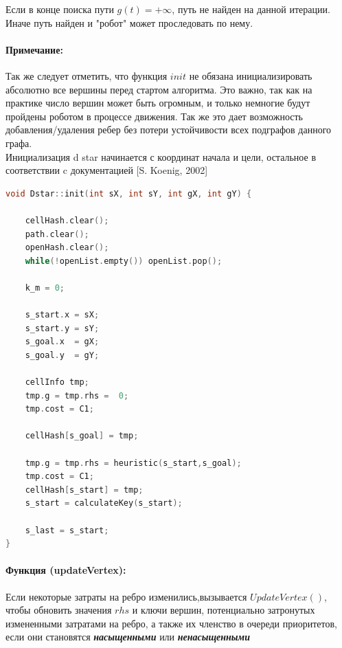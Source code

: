 \documentclass[12pt]{article}
\begin{document}
Если в конце поиска пути $g(t) = + \infty$, путь не найден на данной итерации. Иначе путь найден и "робот" может проследовать по нему.
\paragraph{Примечание:} Так же следует отметить, что функция $init$ не обязана инициализировать абсолютно все вершины перед стартом алгоритма. Это важно, так как на практике число вершин может быть огромным, и только немногие будут пройдены роботом в процессе движения. Так же это дает возможность добавления/удаления ребер без потери устойчивости всех подграфов данного графа.\\
Инициализация d star начинается с координат начала и цели, остальное в соответствии c 
документацией [S. Koenig, 2002]
\newpage
\begin{lstlisting}[language=C,style=C]
void Dstar::init(int sX, int sY, int gX, int gY) {

    cellHash.clear();
    path.clear();
    openHash.clear();
    while(!openList.empty()) openList.pop();

    k_m = 0;

    s_start.x = sX;
    s_start.y = sY;
    s_goal.x  = gX;
    s_goal.y  = gY;

    cellInfo tmp;
    tmp.g = tmp.rhs =  0;
    tmp.cost = C1;

    cellHash[s_goal] = tmp;

    tmp.g = tmp.rhs = heuristic(s_start,s_goal);
    tmp.cost = C1;
    cellHash[s_start] = tmp;
    s_start = calculateKey(s_start);

    s_last = s_start;
}
\end{lstlisting}
\paragraph{Функция (updateVertex):} Если некоторые затраты на ребро изменились,вызывается $UpdateVertex()$, чтобы обновить значения $rhs$ и ключи вершин, потенциально затронутых измененными затратами на ребро, а также их членство в очереди приоритетов, если они становятся \textbf{\emph{насыщенными}} или \textbf{\emph{ненасыщенными}}
\end{document}
